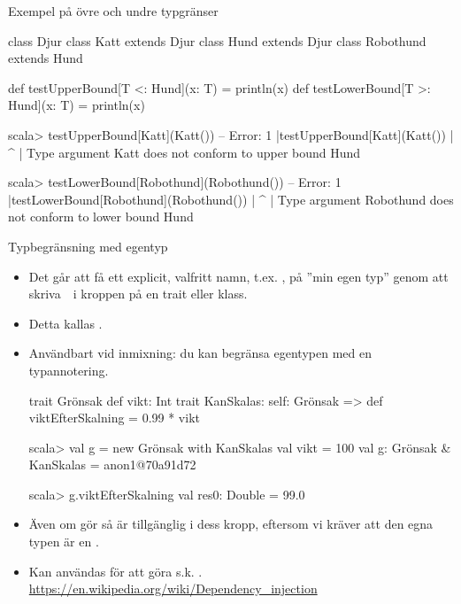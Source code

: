 \begin{Slide}{Exempel på övre och undre typgränser}

\begin{Code}
class Djur
class Katt extends Djur 
class Hund extends Djur
class Robothund extends Hund

def testUpperBound[T <: Hund](x: T) = println(x)
def testLowerBound[T >: Hund](x: T) = println(x)
\end{Code}

\begin{REPL}
scala> testUpperBound[Katt](Katt())
-- Error:
1 |testUpperBound[Katt](Katt())
  |          ^
  |          Type argument Katt does not conform to upper bound Hund

scala> testLowerBound[Robothund](Robothund())
-- Error:
1 |testLowerBound[Robothund](Robothund())
  |          ^
  |          Type argument Robothund does not conform to lower bound Hund
\end{REPL}

\end{Slide}

\begin{Slide}{Typbegränsning med egentyp }\SlideFontSmall
\begin{itemize}\SlideFontTiny
  \item Det går att få ett explicit, valfritt namn, t.ex. ,  på ''min egen typ'' genom att skriva~~i kroppen på en trait eller klass. 
  \item Detta kallas  . 
  \item Användbart vid inmixning: du kan begränsa egentypen med en typannotering.
\begin{Code}
trait Grönsak { def vikt: Int }
trait KanSkalas:
  self: Grönsak =>
  def viktEfterSkalning = 0.99 * vikt 
\end{Code}
\begin{REPLsmall}
scala> val g = new Grönsak with KanSkalas { val vikt = 100 }
val g: Grönsak & KanSkalas = anon1@70a91d72
                                                                                    
scala> g.viktEfterSkalning
val res0: Double = 99.0
\end{REPLsmall}
\item Även om   gör  så är   tillgänglig i dess kropp, eftersom vi kräver att den egna typen är en .
\item Kan användas för att göra s.k.  .\\\url{https://en.wikipedia.org/wiki/Dependency_injection}
\end{itemize}

\end{Slide}



